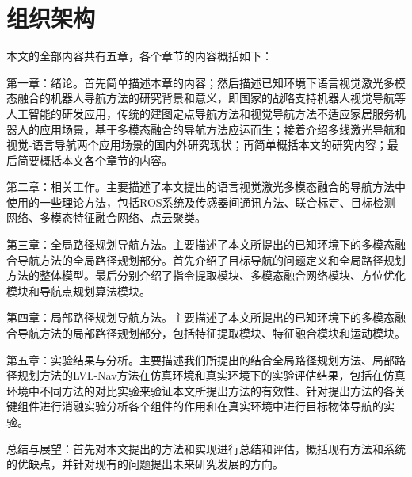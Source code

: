 \section{组织架构}
	本文的全部内容共有五章，各个章节的内容概括如下：

	第一章：绪论。首先简单描述本章的内容；然后描述已知环境下语言视觉激光多模态融合的机器人导航方法的研究背景和意义，即国家的战略支持机器人视觉导航等人工智能的研发应用，传统的建图定点导航方法和视觉导航方法不适应家居服务机器人的应用场景，基于多模态融合的导航方法应运而生；接着介绍多线激光导航和视觉-语言导航两个应用场景的国内外研究现状；再简单概括本文的研究内容；最后简要概括本文各个章节的内容。

	第二章：相关工作。主要描述了本文提出的语言视觉激光多模态融合的导航方法中使用的一些理论方法，包括ROS系统及传感器间通讯方法、联合标定、目标检测网络、多模态特征融合网络、点云聚类。

	第三章：全局路径规划导航方法。主要描述了本文所提出的已知环境下的多模态融合导航方法的全局路径规划部分。首先介绍了目标导航的问题定义和全局路径规划方法的整体模型。最后分别介绍了指令提取模块、多模态融合网络模块、方位优化模块和导航点规划算法模块。

	第四章：局部路径规划导航方法。主要描述了本文所提出的已知环境下的多模态融合导航方法的局部路径规划部分，包括特征提取模块、特征融合模块和运动模块。

	第五章：实验结果与分析。主要描述我们所提出的结合全局路径规划方法、局部路径规划方法的LVL-Nav方法在仿真环境和真实环境下的实验评估结果，包括在仿真环境中不同方法的对比实验来验证本文所提出方法的有效性、针对提出方法的各关键组件进行消融实验分析各个组件的作用和在真实环境中进行目标物体导航的实验。

	总结与展望：首先对本文提出的方法和实现进行总结和评估，概括现有方法和系统的优缺点，并针对现有的问题提出未来研究发展的方向。





